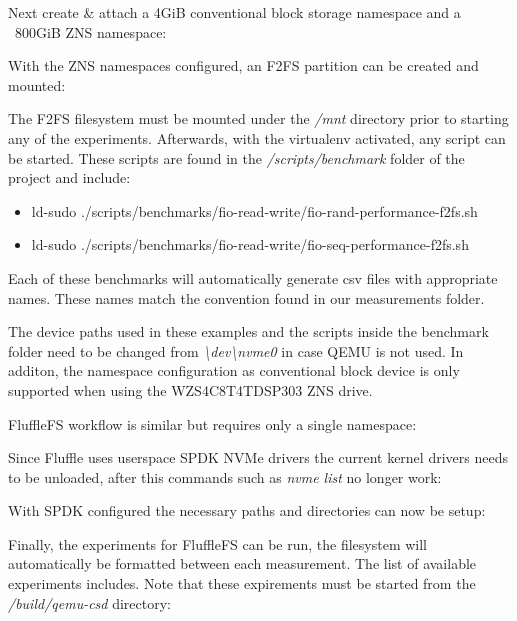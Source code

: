 
Next create \& attach a 4GiB conventional block storage namespace and a
~800GiB ZNS namespace:


With the ZNS namespaces configured, an F2FS partition can be created and
mounted:


The F2FS filesystem must be mounted under the \textit{/mnt} directory prior to
starting any of the experiments. Afterwards, with the virtualenv activated, any
script can be started. These scripts are found in the
\textit{/scripts/benchmark} folder of the project \cite{qemu-csd} and include:

\begin{itemize}
    \item ld-sudo ./scripts/benchmarks/fio-read-write/fio-rand-performance-f2fs.sh
    \item ld-sudo ./scripts/benchmarks/fio-read-write/fio-seq-performance-f2fs.sh
\end{itemize}

Each of these benchmarks will automatically generate csv files with appropriate
names. These names match the convention found in our measurements folder.

The device paths used in these examples and the scripts inside the benchmark
folder need to be changed from \textit{\textbackslash dev\textbackslash nvme0}
in case QEMU is not used. In additon, the namespace configuration as
conventional block device is only supported when using the WZS4C8T4TDSP303 ZNS
drive.

FluffleFS workflow is similar but requires only a single namespace:



Since Fluffle uses userspace SPDK NVMe drivers the current kernel drivers needs
to be unloaded, after this commands such as \textit{nvme list} no longer work:


With SPDK configured the necessary paths and directories can now be setup:


Finally, the experiments for FluffleFS can be run, the filesystem will
automatically be formatted between each measurement. The list of available
experiments includes. Note that these expirements must be started from the
\textit{/build/qemu-csd} directory:

